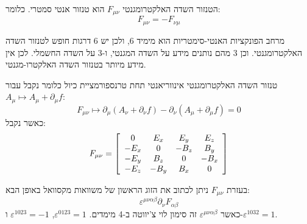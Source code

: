 \documentclass{tstextbook}
\begin{document}
\begin{proposition}
הטנזור השדה האלקטרומגנטי \(F_{\mu \nu}\) הוא טנזור אנטי סמטרי. כלומר:
$$F_{\mu \nu}=-F_{\nu \mu}$$

\end{proposition}
\begin{remark}
מרחב הפונקציות האנטי-סימטריות הוא מימיד 6, ולכן יש 6 דרגות חופש לטנזור השדה האלקטרומגנטי. וכן 3 מהם נותנים מידע על השדה המגנטי, ו-3 על השדה החשמלי. לכן אין מידע מיותר בטנזור השדה האלקטרו-מגנטי.

\end{remark}
\begin{proposition}
טנזור השדה האלקטרומגנטי אינווריאנטי תחת טרנספורמציית כיול
כלומר נקבל עבור \(A_{\mu}\mapsto A_{\mu}+\partial_{\mu }f\):
$$F_{\mu \nu}\mapsto \partial_{\mu}\left( A_{\nu}+\partial_{\nu}f \right)-\partial_{\nu}\left( A_{\mu}+\partial_{\mu}f \right)=0$$
כאשר נקבל:
$$F_{\mu\nu}={\left[\begin{array}{c c c c}{0}&{E_{x}}&{E_{y}}&{E_{z}}\\ {-E_{x}}&{0}&{-B_{z}}&{B_{y}}\\ {-E_{y}}&{B_{z}}&{0}&{-B_{x}}\\ {-E_{z}}&{-B_{y}}&{B_{x}}&{0}\end{array}\right]}$$

\end{proposition}
בעזרת \(F_{\mu \nu}\) ניתן לכתוב את הזוג הראשון של משוואות מקסוואל באופן הבא:
$$\varepsilon^{\mu \nu \alpha \beta}\partial_{\nu}F_{\alpha \beta}$$
כאשר \(\varepsilon^{\mu \nu \alpha \beta}\)  זה סימון לוי צ'יווטה ב-4 מימדים. \(\varepsilon^{0123}=1\), \(\varepsilon^{1023}=-1\) ו-\(\varepsilon^{1032}=1\).
\end{document}
